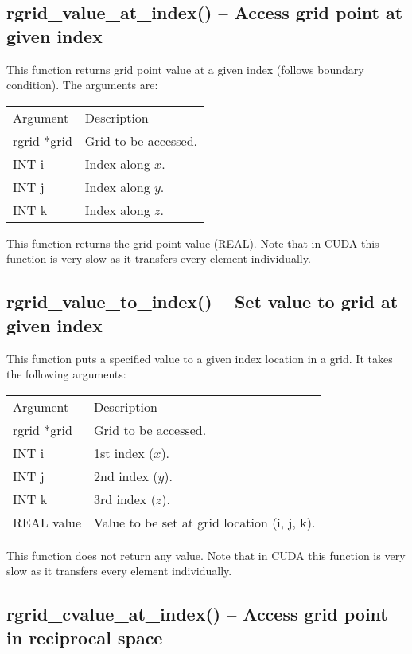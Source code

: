 \documentclass[12pt,letterpaper]{report}
\begin{document}
\subsection{rgrid\_value\_at\_index() -- Access grid point at given index}

This function returns grid point value at a given index (follows boundary condition). The arguments are:
\begin{longtable}{p{} p{}}
Argument & Description\\
\cline{1-2}
rgrid *grid & Grid to be accessed.\\
INT i & Index along $x$.\\
INT j & Index along $y$.\\
INT k & Index along $z$.\\
\end{longtable}
\noindent
This function returns the grid point value (REAL). Note that in CUDA this function is very slow as it transfers every element individually.

\subsection{rgrid\_value\_to\_index() -- Set value to grid at given index}

This function puts a specified value to a given index location in a grid. It takes the following arguments:
\begin{longtable}{p{} p{}}
Argument & Description\\
\cline{1-2}
rgrid *grid & Grid to be accessed.\\
INT i & 1st index ($x$).\\
INT j & 2nd index ($y$).\\
INT k & 3rd index ($z$).\\
REAL value & Value to be set at grid location (i, j, k).\\
\end{longtable}
\noindent
This function does not return any value. Note that in CUDA this function is very slow as it transfers every element individually.

\subsection{rgrid\_cvalue\_at\_index() -- Access grid point in reciprocal space}
\end{document}
